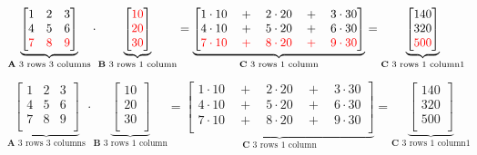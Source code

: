 \documentclass[11pt]{article}
\begin{document}
    \begin{equation*}
\underbrace{
\begin{bmatrix}
1 & 2 & 3 \\
4 & 5 & 6 \\
\color{red}7 & \color{red}8 & \color{red}9 \\
\end{bmatrix}
}_{\mathbf{A} \text{ 3 rows} \text{ 3 columns}}
\cdot
\underbrace{
\begin{bmatrix}
\color{red}{10} \\
\color{red}{20} \\
\color{red}{30} \\
\end{bmatrix}
}_{\mathbf{B} \text{  3 rows} \text{  1 column}}
=\underbrace{
\begin{bmatrix}
1 \cdot 10 \quad + \quad 2 \cdot 20 \quad + \quad 3 \cdot 30 \\
4 \cdot 10 \quad + \quad 5 \cdot 20 \quad + \quad 6 \cdot 30 \\
\color{red}{7 \cdot 10 \quad + \quad 8 \cdot 20 \quad + \quad 9 \cdot 30} \\
\end{bmatrix}
}_{\mathbf{C} \text{  3 rows} \text{  1 column}}
=\underbrace{
\begin{bmatrix}
140 \\
320 \\
\color{red}{500} \\
\end{bmatrix}
}_{\mathbf{C} \text{  3 rows} \text{  1 column1}}
\end{equation*}

    \begin{equation*}
\underbrace{
\begin{bmatrix}
1 & 2 & 3 \\
4 & 5 & 6 \\
7 & 8 & 9 \\
\end{bmatrix}
}_{\mathbf{A} \text{ 3 rows} \text{ 3 columns}}
\cdot
\underbrace{
\begin{bmatrix}
10 \\
20 \\
30 \\
\end{bmatrix}
}_{\mathbf{B} \text{  3 rows} \text{  1 column}}
=\underbrace{
\begin{bmatrix}
1 \cdot 10 \quad + \quad 2 \cdot 20 \quad + \quad 3 \cdot 30 \\
4 \cdot 10 \quad + \quad 5 \cdot 20 \quad + \quad 6 \cdot 30 \\
7 \cdot 10 \quad + \quad 8 \cdot 20 \quad + \quad 9 \cdot 30 \\
\end{bmatrix}
}_{\mathbf{C} \text{  3 rows} \text{  1 column}}
=\underbrace{
\begin{bmatrix}
140 \\
320 \\
500 \\
\end{bmatrix}
}_{\mathbf{C} \text{  3 rows} \text{  1 column1}}
\end{equation*}
\end{document}
